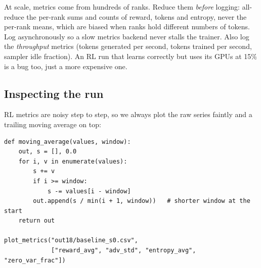 \begin{systemslens}
At scale, metrics come from hundreds of ranks. Reduce them \emph{before} logging: all-reduce
the per-rank sums and counts of reward, tokens and entropy, never the per-rank means, which
are biased when ranks hold different numbers of tokens. Log asynchronously so a slow
metrics backend never stalls the trainer. Also log the \emph{throughput} metrics (tokens
generated per second, tokens trained per second, sampler idle fraction). An RL run that
learns correctly but uses its GPUs at 15\% is a bug too, just a more expensive one.
\end{systemslens}

\subsection{Inspecting the run}\label{sec:grpo2:inspect}

RL metrics are noisy step to step, so we always plot the raw series faintly and a trailing
moving average on top:

\begin{lstlisting}[caption={Trailing moving average and a multi-panel metrics plot (\texttt{llmsys/rl/metrics.py}).},label={lst:grpo2:plot}]
def moving_average(values, window):
    out, s = [], 0.0
    for i, v in enumerate(values):
        s += v
        if i >= window:
            s -= values[i - window]
        out.append(s / min(i + 1, window))   # shorter window at the start
    return out

plot_metrics("out18/baseline_s0.csv",
             ["reward_avg", "adv_std", "entropy_avg", "zero_var_frac"])
\end{lstlisting}

